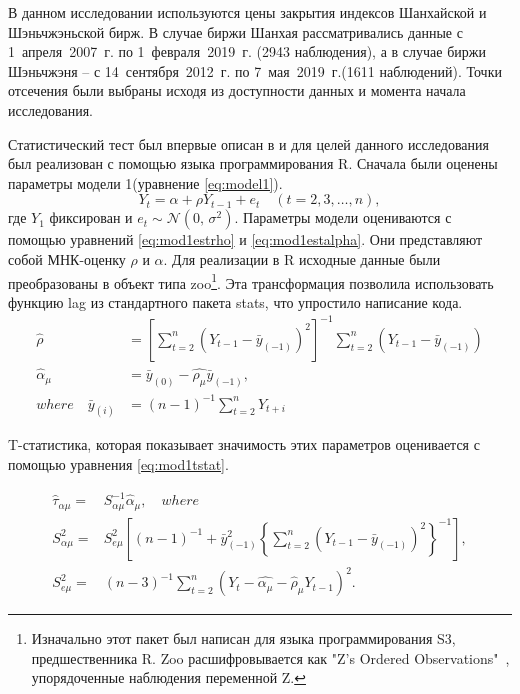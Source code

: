 \documentclass[a4paper,12pt]{article}
\begin{document}
В данном исследовании используются цены закрытия индексов Шанхайской и Шэньчжэньской бирж. В случае биржи Шанхая рассматривались данные с 1~апреля~2007~г. по 1~февраля~2019~г. (2943 наблюдения), а в случае биржи Шэньчжэня -- с 14~сентября~2012~г. по 7~мая~2019~г.(1611 наблюдений). Точки отсечения были выбраны исходя из доступности данных и момента начала исследования.

Статистический тест был впервые описан в \cite{Dickey1981} и для целей данного исследования был реализован с помощью языка программирования R. Сначала были оценены параметры модели 1(уравнение \ref{eq:model1}).
\begin{equation}
  Y_t=\alpha+\rho Y_{t-1}+e_t\quad (t=2,3,\ldots,n),
\label{eq:model1}
\end{equation}
где $Y_1$ фиксирован и $e_t \sim \mathcal{N}(0,\,\sigma^{2})$. Параметры модели оцениваются с помощью уравнений \ref{eq:mod1estrho} и \ref{eq:mod1estalpha}. Они представляют собой МНК-оценку $\rho$ и $\alpha$. Для реализации в R исходные данные были преобразованы в объект типа zoo\footnote{Изначально этот пакет был написан для языка программирования S3, предшественника R. Zoo расшифровывается как "Z's Ordered Observations"\ , упорядоченные наблюдения переменной Z.}. Эта трансформация позволила использовать функцию lag из стандартного пакета stats, что упростило написание кода.
\begin{align}
  \label{eq:mod1estrho}
  \hat{\rho}&=\left[\sum_{t=2}^n (Y_{t-1}-\bar{y}_{(-1)})^2\right]^{-1}
  \sum_{t=2}^n \left(Y_{t-1}-\bar{y}_{(-1)}\right)\\
  \label{eq:mod1estalpha}
  \hat{\alpha}_\mu&=\bar{y}_{(0)}-\hat{\rho_\mu}\bar{y}_{(-1)},\\
where\quad
  \bar{y}_{(i)}&=(n-1)^{-1}\sum_{t=2}^{n}Y_{t+i}
\end{align}

T-статистика, которая показывает значимость этих параметров оценивается с помощью уравнения \ref{eq:mod1tstat}.

\begin{align}
  \label{eq:mod1tstat}
  \hat{\tau}_{\alpha\mu}=&S^{-1}_{\alpha\mu}\hat{\alpha}_\mu,\quad
  where\\
  S^2_{\alpha\mu}=&S^2_{e\mu}
  \left[ (n-1)^{-1}+\bar{y}^2_{(-1)}
  \left\{
  \sum_{t=2}^{n}(Y_{t-1}-\bar{y}_{(-1)})^2\right\}^{-1}\right],\\
  S^2_{e\mu}=&(n-3)^{-1}\sum_{t=2}^{n}(Y_t-\hat{\alpha_\mu}-\hat{\rho}_\mu Y_{t-1})^2.
\end{align}
\end{document}
